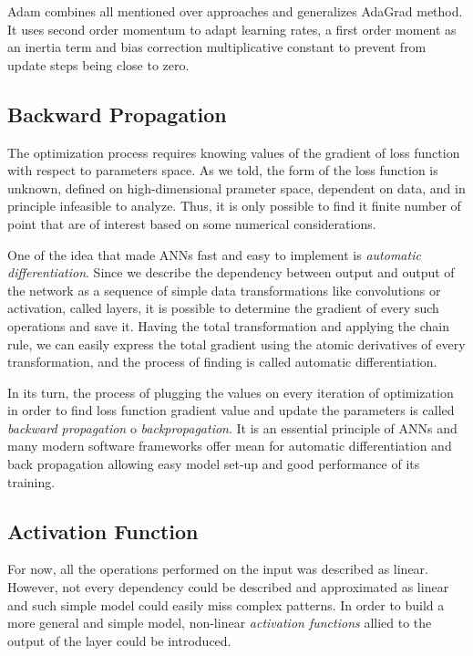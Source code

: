 Adam combines all mentioned over approaches and generalizes AdaGrad method.
It uses second order momentum to adapt learning rates, a first order moment as an inertia term and bias correction multiplicative constant to prevent from update steps being close to zero.

\subsection{Backward Propagation}

The optimization process requires knowing values of the gradient of loss function with respect to parameters space.
As we told, the form of the loss function is unknown, defined on high-dimensional prameter space, dependent on data, and in principle infeasible to analyze.
Thus, it is only possible to find it finite number of point that are of interest based on some numerical considerations.

\medskip
One of the idea that made ANNs fast and easy to implement is \textit{automatic differentiation}.
Since we describe the dependency between output and output of the network as a sequence of simple data transformations like convolutions or activation, called layers, it is possible to determine the gradient of every such operations and save it.
Having the total transformation and applying the chain rule, we can easily express the total gradient using the atomic derivatives of every transformation, and the process of finding is called automatic differentiation. 

\medskip
In its turn, the process of plugging the values on every iteration of optimization in order to find loss function gradient value and update the parameters is called \textit{backward propagation} o \textit{backpropagation}.
It is an essential principle of ANNs and many modern software frameworks offer mean for automatic differentiation and back propagation allowing easy model set-up and good performance of its training\cite{}.


\subsection{Activation Function}

For now, all the operations performed on the input was described as linear.
However, not every dependency could be described and approximated as linear and such simple model could easily miss complex patterns.
In order to build a more general and simple model, non-linear \textit{activation functions} allied to the output of the layer could be introduced.
\medskip

